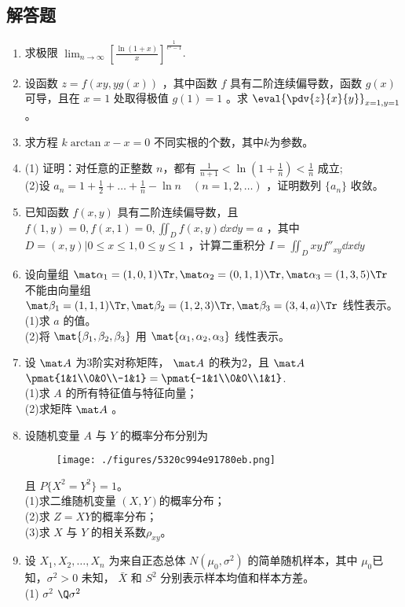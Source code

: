 \subsection{解答题}
\begin{enumerate}
\item 求极限  $\displaystyle \lim_{n\to\infty}[\frac{\ln (1+x)}{x}]^{\frac{1}{e^x-1}}$.
\item 设函数 $z=f(xy,yg(x))$ ，其中函数 $f$ 具有二阶连续偏导数，函数 $g(x)$ 可导，且在 $x=1$ 处取得极值 $g(1)=1$ 。求 $\displaystyle \eval{\pdv{z}{x}{y}}_{x=1,y=1}$。
\item 求方程 $k\arctan x -x=0$ 不同实根的个数，其中$ k$为参数。
\item (1) 证明：对任意的正整数 $n$，都有 $\frac{1}{n+1}<\ln(1+\frac{1}{n})<\frac{1}{n}$ 成立;\\
(2)设 $\displaystyle a_n=1+\frac{1}{2}+\dots+\frac{1}{n}-\ln n\quad (n=1,2,\dots )$  ，证明数列 $\{a_n\}$ 收敛。
\item 已知函数 $f(x,y)$ 具有二阶连续偏导数，且 $f(1,y)=0,f(x,1)=0,\iint_D f(x,y)\dd{x}\dd{y}=a$  ，其中 $D={(x,y)|0\le x \le 1,0 \le y \le 1}$ ，计算二重积分 $\displaystyle I=\iint_D xyf''_{xy}\dd{x}\dd{y}$
\item 设向量组  $\mat \alpha_1=(1,0,1) \Tr,\mat \alpha_2=(0,1,1)\Tr,\mat \alpha_3=(1,3,5)\Tr$  不能由向量组 $ \mat \beta_1=(1,1,1) \Tr,\mat \beta_2=(1,2,3) \Tr,\mat \beta_3=(3,4,a) \Tr$ 线性表示。\\
(1)求 $a$ 的值。\\
(2)将 $\mat {\beta_1,\beta_2,\beta_3}$ 用 $\mat {\alpha_1,\alpha_2,\alpha_3}$ 线性表示。
\item 设 $\mat A$ 为3阶实对称矩阵， $\mat A$  的秩为2，且 $\mat A$ $\pmat{1&1\\0&0\\-1&1}=\pmat{-1&1\\0&0\\1&1}$.\\
(1)求 $A$ 的所有特征值与特征向量；\\
(2)求矩阵  $\mat A$ 。
\item 设随机变量 $A$ 与 $Y$ 的概率分布分别为\begin{figure}[ht]
\centering
\texttt{[image: ./figures/5320c994e91780eb.png]}
\caption{} \label{fig_PeeM11_1}
\end{figure}
且 $P\{X^2=Y^2\}=1$。\\
(1)求二维随机变量 $(X,Y)$的概率分布；\\
(2)求 $Z=XY$的概率分布；\\
(3)求 $X$ 与 $Y$ 的相关系数$\rho_{xy}$。
\item 设 $X_1,X_2,\dots,X_n$ 为来自正态总体 $N(\mu_0,\sigma^2)$ 的简单随机样本，其中  $\mu_0$已知，$\sigma^2>0$  未知， $\bar X$   和 $S^2$ 分别表示样本均值和样本方差。\\
(1)  $\sigma^2$  $\Q \sigma^2$
\end{enumerate}